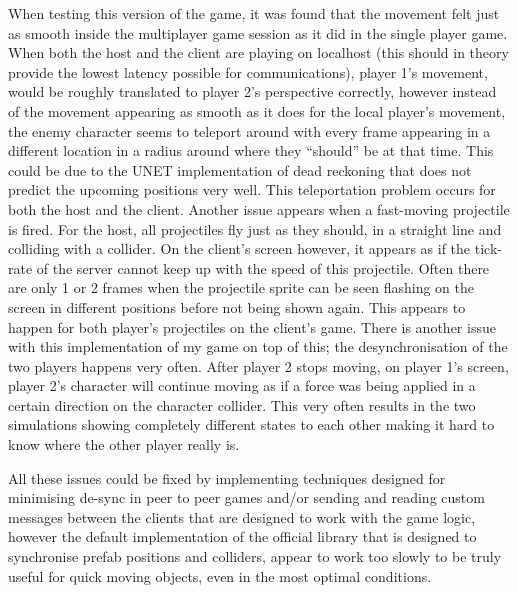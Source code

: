 When testing this version of the game, it was found that the movement felt just as smooth inside the multiplayer game session as it did in the single player game. When both the host and the client are playing on localhost (this should in theory provide the lowest latency possible for communications), player 1's movement, would be roughly translated to player 2's perspective correctly, however instead of the movement appearing as smooth as it does for the local player's movement, the enemy character seems to teleport around with every frame appearing in a different location in a radius around where they ``should'' be at that time. This could be due to the UNET implementation of dead reckoning that does not predict the upcoming positions very well. This teleportation problem occurs for both the host and the client. Another issue appears when a fast-moving projectile is fired. For the host, all projectiles fly just as they should, in a straight line and colliding with a collider. On the client's screen however, it appears as if the tick-rate of the server cannot keep up with the speed of this projectile. Often there are only 1 or 2 frames when the projectile sprite can be seen flashing on the screen in different positions before not being shown again. This appears to happen for both player's projectiles on the client's game. There is another issue with this implementation of my game on top of this; the desynchronisation of the two players happens very often. After player 2 stops moving, on player 1's screen, player 2's character will continue moving as if a force was being applied in a certain direction on the character collider. This very often results in the two simulations showing completely different states to each other making it hard to know where the other player really is.

All these issues could be fixed by implementing techniques designed for minimising de-sync in peer to peer games and/or sending and reading custom messages between the clients that are designed to work with the game logic, however the default implementation of the official library that is designed to synchronise prefab positions and colliders, appear to work too slowly to be truly useful for quick moving objects, even in the most optimal conditions.


\newpage


